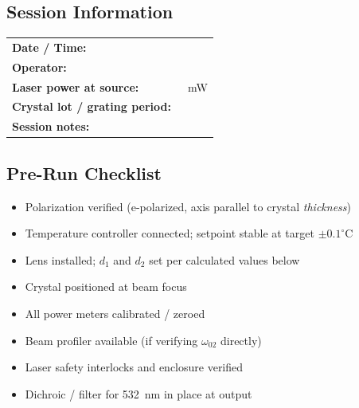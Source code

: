 \documentclass[11pt, letterpaper]{article}
\newcommand{\blank}[1][3cm]{\underline{\hspace{#1}}}
\begin{document}
\subsection*{Session Information}
\renewcommand{\arraystretch}{1.8}
\begin{tabular}{@{}ll@{}}
\textbf{Date / Time:}             & \blank[6cm] \\
\textbf{Operator:}                & \blank[6cm] \\
\textbf{Laser power at source:}   & \blank[4cm]~mW \\
\textbf{Crystal lot / grating period:} & \blank[5cm] \\
\textbf{Session notes:}           & \blank[7cm] \\
\end{tabular}
\renewcommand{\arraystretch}{1}

\subsection*{Pre-Run Checklist}
\begin{itemize}
  \item[$\square$] Polarization verified (e-polarized, axis parallel to crystal \emph{thickness})
  \item[$\square$] Temperature controller connected; setpoint stable at target $\pm 0.1^{\circ}$C
  \item[$\square$] Lens installed; $d_1$ and $d_2$ set per calculated values below
  \item[$\square$] Crystal positioned at beam focus
  \item[$\square$] All power meters calibrated / zeroed
  \item[$\square$] Beam profiler available (if verifying $\omega_{02}$ directly)
  \item[$\square$] Laser safety interlocks and enclosure verified
  \item[$\square$] Dichroic / filter for 532~nm in place at output
\end{itemize}

\end{document}
